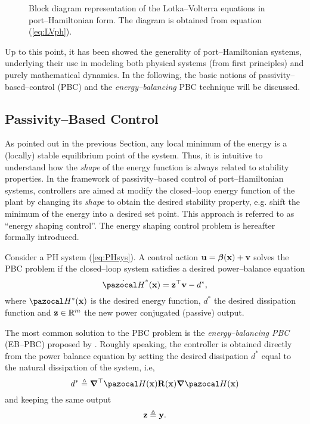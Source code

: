 %
\begin{figure}[!ht]
    \centering
    
    \caption[Block diagram representation of the Lotka--Volterra equations in port--Hamiltonian form.]{Block diagram representation of the Lotka--Volterra equations in port--Hamiltonian form. The diagram is obtained from equation (\ref{eq:LVph}).}
    \label{fig:LVscheme}
\end{figure}
%
Up to this point, it has been showed the generality of port--Hamiltonian systems, underlying their use in modeling both physical systems (from first principles) and purely mathematical dynamics. In the following, the basic notions of passivity--based--control (PBC) and the \textit{energy--balancing} PBC technique will be discussed. 
%
\subsection{Passivity--Based Control}
%
As pointed out in the previous Section, any local minimum of the energy is a (locally) stable equilibrium point of the system. Thus, it is intuitive to understand how the \textit{shape} of the energy function is always related to stability properties. 
In the framework of passivity--based control of port--Hamiltonian systems, controllers are aimed at modify the closed--loop energy function of the plant by changing its \textit{shape} to obtain the desired stability property, e.g. shift the minimum of the energy into a desired set point. This approach is referred to as ``energy shaping control''. The energy shaping control problem is hereafter formally introduced.
%
\begin{prob}
Consider a PH system (\ref{eq:PHsys}). A control action $\mathbf{u} = \bm\beta(\mathbf{x}) + \mathbf{v}$ solves the PBC problem if the closed--loop system satisfies a desired power--balance equation
%
\begin{equation*}
	\dot{\Ha}^*(\xb)
	= \zb^\top \vb - d^*,
\end{equation*}
where $\Ha^*(\xb)$ is the desired energy function, $d^*$ the desired dissipation function and $\mathbf{z}\in\mathbb{R}^m$ the new power conjugated (passive) output.
\end{prob}
%
The most common solution to the PBC problem is the \textit{energy--balancing PBC} (EB--PBC) proposed by \cite{ortega2000}. Roughly speaking, the controller is obtained directly from the power balance equation by setting the desired dissipation $d^*$ equal to the natural dissipation of the system, i.e,
%
\begin{equation}
    d^* \triangleq \bm\nabla^\top\Ha(\xb)\mathbf{R}(\xb)\bm\nabla\Ha(\xb)
\end{equation}
%
and keeping the same output 
%
\begin{equation}
    \mathbf{z} \triangleq \mathbf{y}.
\end{equation}
%

